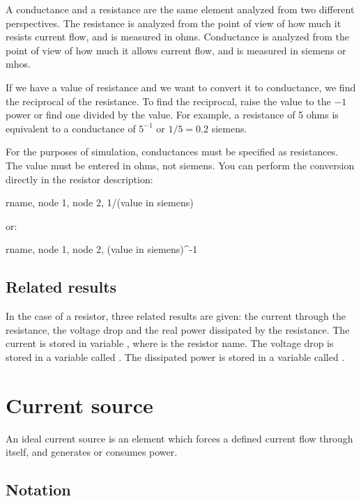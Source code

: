 A conductance and a resistance are the same element analyzed from
two different perspectives. The resistance is analyzed from the
point of view of how much it resists current flow, and is measured
in ohms. Conductance is analyzed from the point of view of how much
it allows current flow, and is measured in siemens or mhos.

If we have a value of resistance and we want to convert it to
conductance, we find the reciprocal of the resistance. To find the
reciprocal, raise the value to the $-1$ power or find one divided by
the value. For example, a resistance of 5 ohms is equivalent to a
conductance of $5^{-1}$ or $1/5 = 0.2$ siemens.

For the purposes of simulation, conductances must be specified as
resistances. The value must be entered in ohms, not siemens. You can
perform the conversion directly in the resistor description:

\begin{entry}
rname, node 1, node 2, 1/(value in siemens)
\end{entry}

or:

\begin{entry}
rname, node 1, node 2, (value in siemens)^-1
\end{entry}

\subsection{Related results}

In the case of a resistor, three related results are given: the
current through the resistance, the voltage drop and the real power
dissipated by the resistance. The current is stored in variable
, where  is the resistor name. The voltage
drop is stored in a variable called . The dissipated
power is stored in a variable called .

\section{Current source}

An ideal current source is an element which forces a defined current
flow through itself, and generates or consumes power.

\subsection{Notation}

